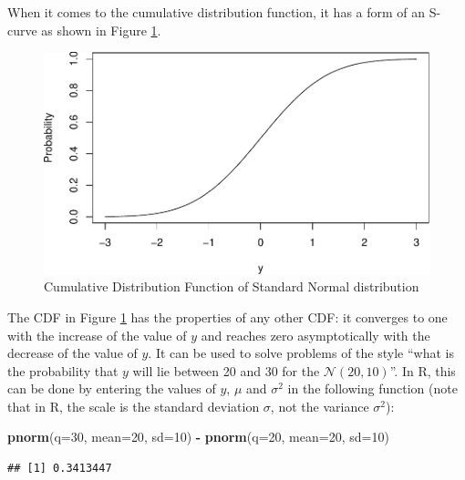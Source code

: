 \documentclass[
]{book}
\newenvironment{Shaded}{\begin{snugshade}}{\end{snugshade}}
\newcommand{\DataTypeTok}[1]{\textcolor[rgb]{0.13,0.29,0.53}{#1}}
\newcommand{\DecValTok}[1]{\textcolor[rgb]{0.00,0.00,0.81}{#1}}
\newcommand{\KeywordTok}[1]{\textcolor[rgb]{0.13,0.29,0.53}{\textbf{#1}}}
\newcommand{\NormalTok}[1]{#1}
\newcommand{\OperatorTok}[1]{\textcolor[rgb]{0.81,0.36,0.00}{\textbf{#1}}}
\newcommand{\StringTok}[1]{\textcolor[rgb]{0.31,0.60,0.02}{#1}}
\theoremstyle{definition}
\theoremstyle{definition}
\theoremstyle{definition}
\theoremstyle{definition}
\theoremstyle{remark}
\begin{document}
When it comes to the cumulative distribution function, it has a form of an S-curve as shown in Figure \ref{fig:pnormPlot}.

\begin{figure}
\centering
\includegraphics{Svetunkov---Statistics-for-Business-Analytics_files/figure-latex/pnormPlot-1.pdf}
\caption{\label{fig:pnormPlot}Cumulative Distribution Function of Standard Normal distribution}
\end{figure}

The CDF in Figure \ref{fig:pnormPlot} has the properties of any other CDF: it converges to one with the increase of the value of \(y\) and reaches zero asymptotically with the decrease of the value of \(y\). It can be used to solve problems of the style ``what is the probability that \(y\) will lie between 20 and 30 for the \(\mathcal{N}(20, 10)\)''. In R, this can be done by entering the values of \(y\), \(\mu\) and \(\sigma^2\) in the following function (note that in R, the scale is the standard deviation \(\sigma\), not the variance \(\sigma^2\)):

\begin{Shaded}
\begin{Highlighting}[]
\KeywordTok{pnorm}\NormalTok{(}\DataTypeTok{q=}\DecValTok{30}\NormalTok{, }\DataTypeTok{mean=}\DecValTok{20}\NormalTok{, }\DataTypeTok{sd=}\DecValTok{10}\NormalTok{) }\OperatorTok{{-}}\StringTok{ }\KeywordTok{pnorm}\NormalTok{(}\DataTypeTok{q=}\DecValTok{20}\NormalTok{, }\DataTypeTok{mean=}\DecValTok{20}\NormalTok{, }\DataTypeTok{sd=}\DecValTok{10}\NormalTok{)}
\end{Highlighting}
\end{Shaded}

\begin{verbatim}
## [1] 0.3413447
\end{verbatim}
\end{document}
